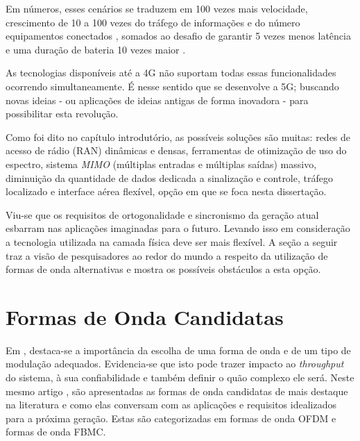 \par Em números, esses cenários se traduzem em 100 vezes mais velocidade, crescimento de 10 a 100 vezes do tráfego de informações e  do número equipamentos conectados \cite{METIS3}, somados ao desafio de garantir 5 vezes menos latência e uma duração de bateria 10 vezes maior \cite{Afif}.    
\par As tecnologias disponíveis até a 4G não suportam todas essas funcionalidades ocorrendo simultaneamente. É nesse sentido que se desenvolve a 5G; buscando novas ideias - ou aplicações de ideias antigas de forma inovadora - para possibilitar esta revolução. 
\par  Como foi dito no capítulo introdutório, as possíveis soluções são muitas: \cite{Monserrat} redes de acesso de rádio (RAN) dinâmicas e densas, ferramentas de otimização de uso do espectro, sistema \textit{MIMO} (múltiplas entradas e múltiplas saídas) massivo, diminuição da quantidade de dados dedicada a sinalização e controle, tráfego localizado e interface aérea flexível, opção em que se foca nesta dissertação. 
\par Viu-se que os requisitos de ortogonalidade e sincronismo da geração atual esbarram nas aplicações imaginadas para o futuro. Levando isso em consideração a tecnologia utilizada na camada física deve ser mais flexível. A seção a seguir traz a visão de pesquisadores ao redor do mundo a respeito da utilização de formas de onda alternativas e mostra os possíveis obstáculos a esta opção. 

\section{Formas de Onda Candidatas} 

Em \cite{Maziar}, destaca-se a importância da escolha de uma forma de onda e de um tipo de modulação adequados. Evidencia-se que isto pode trazer impacto ao \textit{throughput} do sistema, à sua confiabilidade e também definir o quão complexo ele será. 
Neste mesmo artigo \cite{Maziar}, são apresentadas as formas de onda candidatas de mais destaque na literatura e como elas conversam com as aplicações e requisitos idealizados para a próxima geração. Estas são categorizadas em formas de onda OFDM e formas de onda FBMC.  

